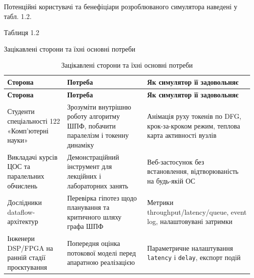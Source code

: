 \documentclass[
]{article}
\newcommand{\passthrough}[1]{#1}
\begin{document}
Потенційні користувачі та бенефіціари розроблюваного симулятора наведені
у табл. 1.2.

Таблиця 1.2

Зацікавлені сторони та їхні основні потреби

\begin{longtable}[]{@{}
  >{\raggedright\arraybackslash}p{}
  >{\raggedright\arraybackslash}p{}
  >{\raggedright\arraybackslash}p{}@{}}
\caption[Зацікавлені сторони та їхні основні потреби]{Зацікавлені
сторони та їхні основні потреби}\tabularnewline
\toprule\noalign{}
\begin{minipage}[b]{\linewidth}\raggedright
\textbf{Сторона}
\end{minipage} & \begin{minipage}[b]{\linewidth}\raggedright
\textbf{Потреба}
\end{minipage} & \begin{minipage}[b]{\linewidth}\raggedright
\textbf{Як симулятор її задовольняє}
\end{minipage} \\
\midrule\noalign{}
\endfirsthead
\toprule\noalign{}
\begin{minipage}[b]{\linewidth}\raggedright
\textbf{Сторона}
\end{minipage} & \begin{minipage}[b]{\linewidth}\raggedright
\textbf{Потреба}
\end{minipage} & \begin{minipage}[b]{\linewidth}\raggedright
\textbf{Як симулятор її задовольняє}
\end{minipage} \\
\midrule\noalign{}
\endhead
\bottomrule\noalign{}
\endlastfoot
Студенти спеціальності 122 «Комп'ютерні науки» & Зрозуміти внутрішню
роботу алгоритму ШПФ, побачити паралелізм і токенну динаміку & Анімація
руху токенів по DFG, крок-за-кроком режим, теплова карта активності
вузлів \\
Викладачі курсів ЦОС та паралельних обчислень & Демонстраційний
інструмент для лекційних і лабораторних занять & Веб-застосунок без
встановлення, відтворюваність на будь-якій ОС \\
Дослідники dataflow-архітектур & Перевірка гіпотез щодо планування та
критичного шляху графа ШПФ & Метрики throughput/latency/queue, event
log, налаштовувані затримки \\
Інженери DSP/FPGA на ранній стадії проєктування & Попередня оцінка
потокової моделі перед апаратною реалізацією & Параметричне налаштування
\passthrough{\lstinline!latency!} і \passthrough{\lstinline!delay!},
експорт подій \\
\end{longtable}
\end{document}
